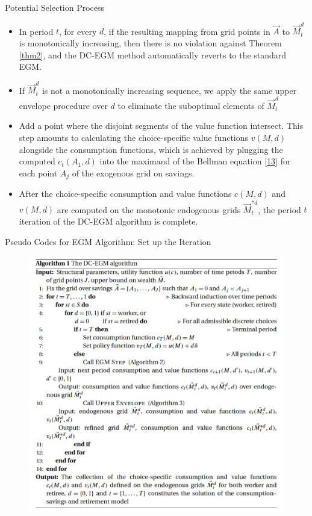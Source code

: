 \documentclass[aspectratio=169]{beamer}
\begin{document}
\begin{frame}{Potential Selection Process}
	\begin{itemize}
		\item In period $t$, for every $d$, if the resulting mapping from grid points in $\overrightarrow{A}$ to $\overrightarrow{M}_t^d$ is monotonically increasing, then there is no violation against Theorem \ref{thm2}, and the DC-EGM method automatically reverts to the standard EGM.
		\item If $\overrightarrow{M}_t^d$ is not a monotonically increasing sequence, we apply the same upper envelope procedure over $d$ to eliminate the suboptimal elements of $\overrightarrow{M}_t^d$ 
		\item Add a point where the disjoint segments of the value function intersect. This step amounts to calculating the choice-specific value functions $v(M,d)$ alongside the consumption functions, which is achieved by plugging the computed $c_t(A_1, d)$ into the maximand of the Bellman equation \ref{13} for each point $A_j$ of the exogenous grid on savings.
		\item After the choice-specific consumption and value functions $c(M, d)$ and $v(M, d)$ are computed on the monotonic endogenous grids $\overrightarrow{M}_t^{*d}$, the period $t$ iteration of the DC-EGM algorithm is complete.
	\end{itemize}
\end{frame}

\begin{frame}{Pseudo Codes for EGM Algorithm: Set up the Iteration}
	\begin{figure}
		\includegraphics[scale=0.45]{algorithm1.jpg}
	\end{figure}
\end{frame}
\end{document}
